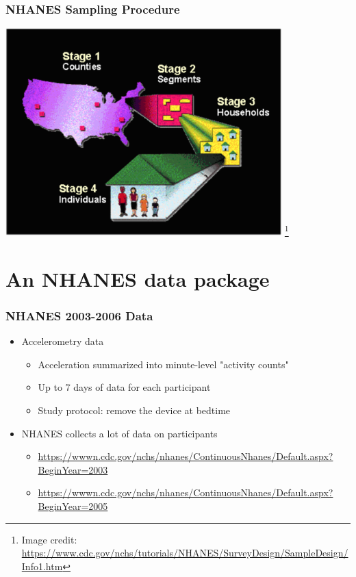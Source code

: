 \documentclass[10pt]{beamer}\usepackage[]{graphicx}\usepackage[]{color}
\newcommand\blfootnote[1]{%
  \begingroup
  \renewcommand\thefootnote{}\footnote{#1}%
  \addtocounter{footnote}{-1}%
  \endgroup
}
\begin{document}
\begin{frame}
\frametitle{NHANES Sampling Procedure}
\centering
\includegraphics[width=0.8\textwidth]{NHANES_sampling}
\blfootnote{Image credit: \url{https://www.cdc.gov/nchs/tutorials/NHANES/SurveyDesign/SampleDesign/Info1.htm}}
\end{frame}



\section{An NHANES data package}

\begin{frame}
\frametitle{NHANES 2003-2006 Data}
\begin{itemize}
\item Accelerometry data
    \begin{itemize}
    \item Acceleration summarized into minute-level "activity counts"
    \item Up to 7 days of data for each participant
    \item Study protocol: remove the device at bedtime
    \end{itemize}
\item NHANES collects a lot of data on participants 
    \begin{itemize}
    \item \url{https://wwwn.cdc.gov/nchs/nhanes/ContinuousNhanes/Default.aspx?BeginYear=2003}
    \item \url{https://wwwn.cdc.gov/nchs/nhanes/ContinuousNhanes/Default.aspx?BeginYear=2005}
    \end{itemize}
\end{itemize}
\end{frame}
\end{document}
